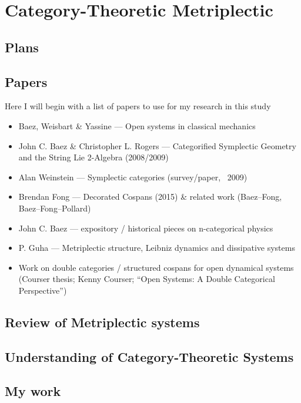 \chapter{Category-Theoretic Metriplectic}
\section{Plans}
\section{Papers}
Here I will begin with a list of papers to use for my research in this study
\begin{itemize}
  \item Baez, Weisbart \& Yassine — Open systems in classical mechanics
  \item John C. Baez \& Christopher L. Rogers — Categorified Symplectic Geometry and the String Lie 2-Algebra (2008/2009)
  \item Alan Weinstein — Symplectic categories (survey/paper, ~2009)
  \item Brendan Fong — Decorated Cospans (2015) \& related work (Baez–Fong, Baez–Fong–Pollard)
  \item John C. Baez — expository / historical pieces on n-categorical physics
  \item P. Guha — Metriplectic structure, Leibniz dynamics and dissipative systems
  \item Work on double categories / structured cospans for open dynamical systems (Courser thesis; Kenny Courser; “Open Systems: A Double Categorical Perspective”)

\end{itemize}
\section{Review of Metriplectic systems}



\section{Understanding of Category-Theoretic Systems}

\section{My work}

